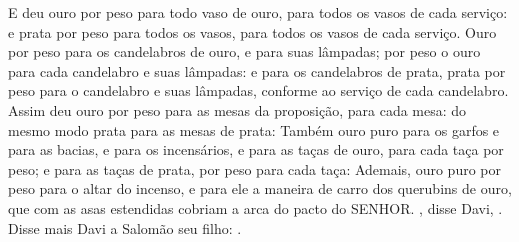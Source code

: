 {  E deu ouro por peso para todo vaso de ouro, para todos os vasos de cada serviço: e prata por peso para todos os vasos, para todos os vasos de cada serviço.
  Ouro por peso para os candelabros de ouro, e para suas lâmpadas; por peso o ouro para cada candelabro e suas lâmpadas: e para os candelabros de prata, prata por peso para o candelabro e suas lâmpadas, conforme ao serviço de cada candelabro.
  Assim deu ouro por peso para as mesas da proposição, para cada mesa: do mesmo modo prata para as mesas de prata:
  Também ouro puro para os garfos e para as bacias, e para os incensários, e para as taças de ouro, para cada taça por peso; e para as taças de prata, por peso para cada taça:
  Ademais, ouro puro por peso para o altar do incenso, e para ele a maneira de carro dos querubins de ouro, que com as asas estendidas cobriam a arca do pacto do SENHOR.
  , disse Davi, .
  Disse mais Davi a Salomão seu filho: .
\par }

